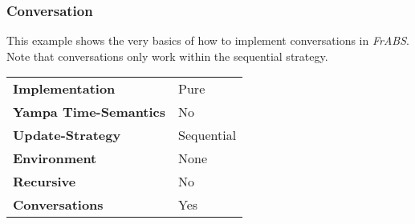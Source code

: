 \subsubsection{Conversation} This example shows the very basics of how to implement conversations in \textit{FrABS}. Note that conversations only work within the sequential strategy.

\begin{center}
\begin{tabular}{l || l }
\textbf{Implementation}			& Pure \\
\textbf{Yampa Time-Semantics}	& No \\
\textbf{Update-Strategy}		& Sequential \\
\textbf{Environment}			& None \\
\textbf{Recursive}				& No \\
\textbf{Conversations}			& Yes \\
\end{tabular}
\end{center}